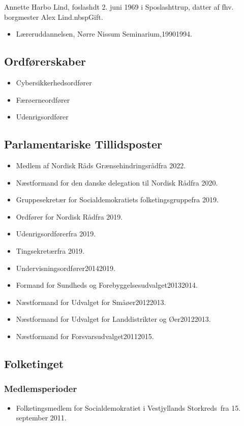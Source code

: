 \documentclass[11pt, a4paper]{awesome-cv}
\begin{document}
\makecvheader[R]
\makelettertitle
\begin{cvletter}
Annette Harbo Lind, foslashdt 2. juni 1969 i Sposlashttrup, datter af fhv. borgmester Alex Lind.nbspGift.

\begin{itemize}
\item Læreruddannelsen, Nørre Nissum Seminarium,19901994.
\end{itemize}
\subsection*{Ordførerskaber}
\begin{itemize}
\item Cybersikkerhedsordfører
\item Færøerneordfører
\item Udenrigsordfører
\end{itemize}
\subsection*{Parlamentariske Tillidsposter}
\begin{itemize}
\item Medlem af Nordisk Råds Grænsehindringsrådfra 2022.
\item Næstformand for den danske delegation til Nordisk Rådfra 2020.
\item Gruppesekretær for Socialdemokratiets folketingsgruppefra 2019.
\item Ordfører for Nordisk Rådfra 2019.
\item Udenrigsordførerfra 2019.
\item Tingsekretærfra 2019.
\item Undervisningsordfører20142019.
\item Formand for Sundheds og Forebyggelsesudvalget20132014.
\item Næstformand for Udvalget for Småøer20122013.
\item Næstformand for Udvalget for Landdistrikter og Øer20122013.
\item Næstformand for Forsvarsudvalget20112015.
\end{itemize}
\subsection*{Folketinget}
\subsubsection*{Medlemsperioder}
\begin{itemize}
\item Folketingsmedlem for Socialdemokratiet i Vestjyllands Storkreds fra 15. september 2011.
\end{itemize}

\end{cvletter}
\end{document}

